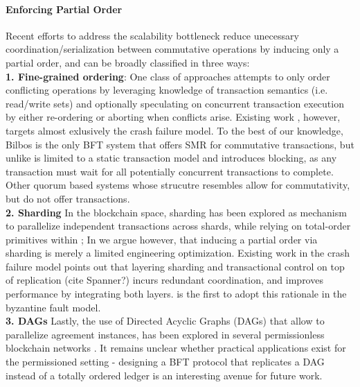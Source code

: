 \paragraph{Enforcing Partial Order}
Recent efforts to address the scalability bottleneck reduce unecessary coordination/serialization between commutative operations by inducing only a partial order, and can be broadly classified in three ways:\\
\textbf{1. Fine-grained ordering}: One class of approaches attempts to only order conflicting operations by leveraging knowledge of transaction semantics (i.e. read/write sets) and optionally speculating on concurrent transaction execution by either re-ordering or aborting when conflicts arise. Existing work \cite{moraru2013there, lamport2005generalized, sutra2011fast, li2012redblue, park2019exploiting, yan2018carousel, mu2016consolidating, mu2014extracting, zhang2015tapir, kraska2013mdcc}, however, targets almost exlusively the crash failure model. To the best of our knowledge, Bilbos \cite{bazzi2018clairvoyant} is the only BFT system that offers SMR for commutative transactions, but unlike \sys is limited to a static transaction model and introduces blocking, as any transaction must wait for all potentially concurrent transactions to complete. Other quorum based systems whose strucutre \sys resembles \cite{malkhi1998byzantine, abd2005fault, cowling2006hq, liskov2006tolerating} allow for commutativity, but do not offer transactions. \\
\textbf{2. Sharding} In the blockchain space, sharding has been explored as mechanism to parallelize independent transactions across shards, while relying on total-order primitives within \cite{zamani2018rapidchain, al2017chainspace, kokoris2018omniledger}; In \sys we argue however, that inducing a partial order via sharding is merely a limited engineering optimization. Existing work in the crash failure model \cite{zhang2016operation, zhang2015tapir, mu2016consolidating } points out that layering sharding and transactional control on top of replication (cite Spanner?) incurs redundant coordination, and improves performance by integrating both layers. \sys is the first to adopt this rationale in the byzantine fault model.\\
\textbf{3. DAGs} Lastly, the use of Directed Acyclic Graphs (DAGs) that allow to parallelize agreement instances, has been explored in several permissionless blockchain networks \cite{pervez2018comparative, popov2016tangle, rocket2018snowflake}. It remains unclear whether practical applications exist for the permissioned setting - designing a BFT protocol that replicates a DAG instead of a totally ordered ledger is an interesting avenue for future work.

